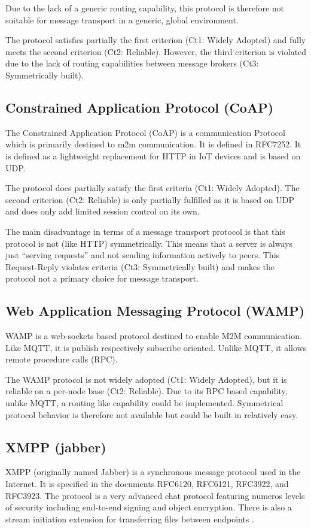 \documentclass[a4paper,appendixprefix,pdfusetitle,twocolumn,fontsize=8pt,DIV=calc,8pt,draft]{\doctype} %
\begin{document}
Due to the lack of a generic routing capability, this protocol is therefore not suitable for message transport in a generic, global environment.

The protocol satisfies partially the first criterion (Ct1: Widely Adopted) and fully meets the second criterion (Ct2: Reliable). However, the third criterion is violated due to the lack of routing capabilities between message brokers (Ct3: Symmetrically built).

\subsection{Constrained Application Protocol (CoAP)}
The Constrained Application Protocol (CoAP) is a communication Protocol which is primarily destined to m2m communication. It is defined in RFC7252\cite{RFC7252}.  It is defined as a lightweight replacement for HTTP in IoT devices and is based on UDP.

The protocol does partially satisfy the first criteria (Ct1: Widely Adopted). The second criterion (Ct2: Reliable) is only partially fulfilled as it is based on UDP and does only add limited session control on its own.

The main disadvantage in terms of a message transport protocol is that this protocol is not (like HTTP) symmetrically. This means that a server is always just ``serving requests'' and not sending information actively to peers. This Request-Reply violates criteria (Ct3: Symmetrically built) and makes the protocol not a primary choice for message transport. 

\subsection{Web Application Messaging Protocol (WAMP)}
WAMP is a web-sockets based protocol destined to enable M2M communication. Like MQTT, it is publish respectively subscribe oriented. Unlike MQTT, it allows remote procedure calls (RPC).

The WAMP protocol is not widely adopted (Ct1: Widely Adopted), but it is reliable on a per-node base (Ct2: Reliable). Due to its RPC based capability, unlike MQTT, a routing like capability could be implemented. Symmetrical protocol behavior is therefore not available but could be built in relatively easy.

\subsection{XMPP (jabber)}
XMPP (originally named Jabber) is a synchronous message protocol used in the Internet. It is specified in the documents RFC6120\cite{RFC6120}, RFC6121\cite{RFC6120}, RFC3922\cite{RFC3922}, and RFC3923\cite{RFC3923}. The protocol is a very advanced chat protocol featuring numeros levels of security including end-to-end signing and object encryption\cite{RFC3923}. There is also a stream initiation extension for transferring files between endpoints \cite{xep0096}.
\end{document}
